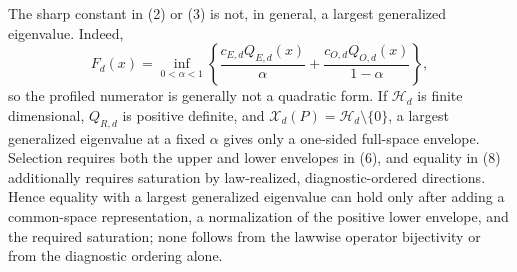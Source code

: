 The sharp constant in (2) or (3) is not, in general, a largest generalized eigenvalue.  Indeed,
\[
 F_d(x)=\inf_{0<\alpha<1}
 \left\{
 \frac{c_{E,d}Q_{E,d}(x)}{\alpha}
 +\frac{c_{O,d}Q_{O,d}(x)}{1-\alpha}
 \right\},
 \tag{9}
\]
so the profiled numerator is generally not a quadratic form.  If \(\mathcal H_d\) is finite dimensional, \(Q_{R,d}\) is positive definite, and \(\mathcal X_d(P)=\mathcal H_d\setminus\{0\}\), a largest generalized eigenvalue at a fixed \(\alpha\) gives only a one-sided full-space envelope.  Selection requires both the upper and lower envelopes in (6), and equality in (8) additionally requires saturation by law-realized, diagnostic-ordered directions.  Hence equality with a largest generalized eigenvalue can hold only after adding a common-space representation, a normalization of the positive lower envelope, and the required saturation; none follows from the lawwise operator bijectivity or from the diagnostic ordering alone.